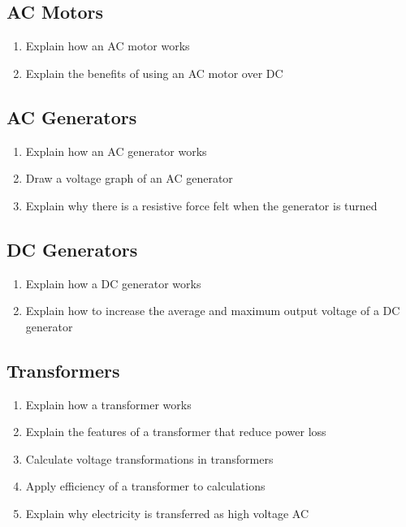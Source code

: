 \documentclass[a4paper,11pt]{report}
\begin{document}
\subsection{AC Motors}

\begin{enumerate}
\item Explain how an AC motor works
\item Explain the benefits of using an AC motor over DC
\end{enumerate}

\subsection{AC Generators}

\begin{enumerate}
\item Explain how an AC generator works
\item Draw a voltage graph of an AC generator
\item Explain why there is a resistive force felt when the generator is turned
\end{enumerate}

\subsection{DC Generators}

\begin{enumerate}
\item Explain how a DC generator works
\item Explain how to increase the average and maximum output voltage of a DC
	generator
\end{enumerate}

\subsection{Transformers}

\begin{enumerate}
\item Explain how a transformer works
\item Explain the features of a transformer that reduce power loss
\item Calculate voltage transformations in transformers
\item Apply efficiency of a transformer to calculations
\item Explain why electricity is transferred as high voltage AC
\end{enumerate}
\end{document}
